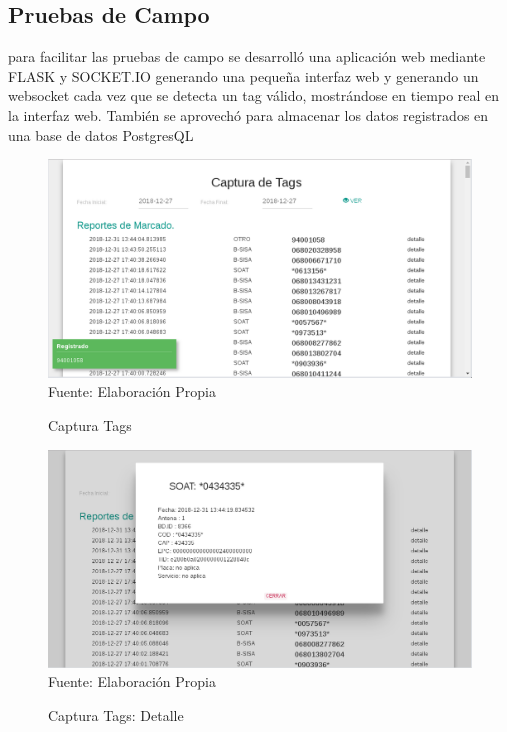 \documentclass[fleqn,10pt]{SelfArx} %
\begin{document}
\subsection*{Pruebas de Campo}

para facilitar las pruebas de campo se desarrolló una aplicación web mediante FLASK y SOCKET.IO generando una pequeña interfaz web y generando un websocket cada vez que se detecta un tag válido, mostrándose en tiempo real en la interfaz web. También se aprovechó para almacenar los datos registrados en una base de datos PostgresQL

\begin{figure}[ht]
\caption{Captura Tags}
\centering
\includegraphics[width=\linewidth]{captura_lector}
\newline Fuente: Elaboración Propia
\label{fig:captura_tag}
\end{figure}

\begin{figure}[ht]
\caption{Captura Tags: Detalle}
\centering
\includegraphics[width=\linewidth]{captura_detalles}
\newline Fuente: Elaboración Propia
\label{fig:captura_detalles}
\end{figure}
\end{document}
